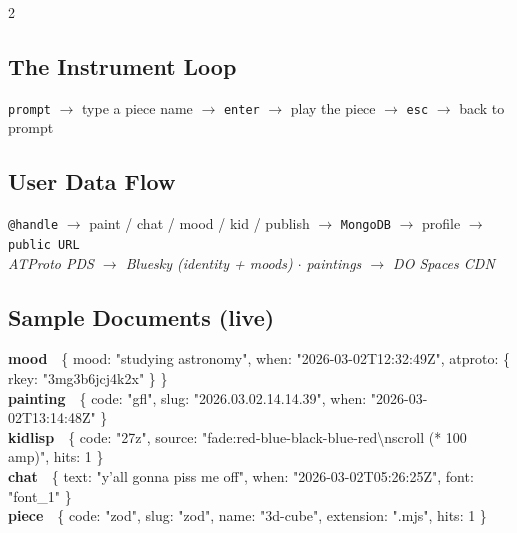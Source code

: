 \documentclass[10pt,letterpaper,twocolumn]{article}
\begin{document}
\begin{multicols}{2}

\subsection*{The Instrument Loop}

\begin{center}
\small
\texttt{\color{acpurple}prompt} $\rightarrow$ type a piece name $\rightarrow$ \texttt{\color{acpurple}enter} $\rightarrow$ play the piece $\rightarrow$ \texttt{\color{acpurple}esc} $\rightarrow$ back to prompt
\end{center}

\subsection*{User Data Flow}

\begin{center}
\small
\texttt{\color{acpurple}@handle} $\rightarrow$ paint / chat / mood / kid / publish $\rightarrow$ \texttt{\color{acpurple}MongoDB} $\rightarrow$ profile $\rightarrow$ \texttt{\color{acpurple}public URL}\\[0.3em]
{\footnotesize\itshape\color{acpurple} ATProto PDS $\rightarrow$ Bluesky (identity + moods) $\cdot$ paintings $\rightarrow$ DO Spaces CDN}
\end{center}

\columnbreak

\subsection*{Sample Documents (live)}

{\small\ttfamily
\textbf{\color{acpurple}mood}~~\{ mood: "studying astronomy", when: "2026-03-02T12:32:49Z", atproto: \{ rkey: "3mg3b6jcj4k2x" \} \}\\[0.3em]
\textbf{\color{acpurple}painting}~~\{ code: "gfl", slug: "2026.03.02.14.14.39", when: "2026-03-02T13:14:48Z" \}\\[0.3em]
\textbf{\color{acpurple}kidlisp}~~\{ code: "27z", source: "fade:red-blue-black-blue-red\textbackslash nscroll (* 100 amp)", hits: 1 \}\\[0.3em]
\textbf{\color{acpurple}chat}~~\{ text: "y'all gonna piss me off", when: "2026-03-02T05:26:25Z", font: "font\_1" \}\\[0.3em]
\textbf{\color{acpurple}piece}~~\{ code: "zod", slug: "zod", name: "3d-cube", extension: ".mjs", hits: 1 \}
}

\end{multicols}
\end{document}
